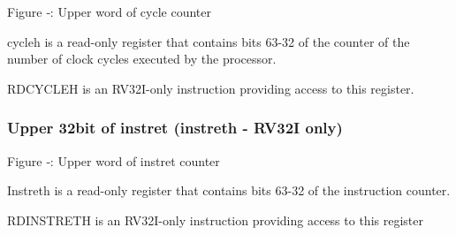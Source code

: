 \missingfigure{}

Figure ‑: Upper word of cycle counter

cycleh is a read-only register that contains bits 63-32 of the counter
of the number of clock cycles executed by the processor.

RDCYCLEH is an RV32I-only instruction providing access to this register.

\subsubsection{Upper 32bit of instret (instreth - RV32I
only)}\label{upper-32bit-of-instret-instreth---rv32i-only}

\missingfigure{}

Figure ‑: Upper word of instret counter

Instreth is a read-only register that contains bits 63-32 of the
instruction counter.

RDINSTRETH is an RV32I-only instruction providing access to this
register